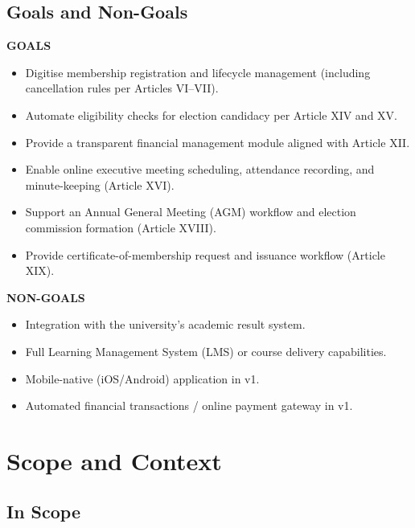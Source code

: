 \documentclass[12pt,a4paper]{article}
\begin{document}
\subsection{Goals and Non-Goals}

\textbf{\small\color{DeepNavy}GOALS}\vspace{4pt}

\begin{itemize}[noitemsep]
  \item Digitise membership registration and lifecycle management (including cancellation rules per Articles VI--VII).
  \item Automate eligibility checks for election candidacy per Article XIV and XV.
  \item Provide a transparent financial management module aligned with Article XII.
  \item Enable online executive meeting scheduling, attendance recording, and minute-keeping (Article XVI).
  \item Support an Annual General Meeting (AGM) workflow and election commission formation (Article XVIII).
  \item Provide certificate-of-membership request and issuance workflow (Article XIX).
\end{itemize}

\textbf{\small\color{DeepNavy}NON-GOALS}\vspace{4pt}

\begin{itemize}[noitemsep]
  \item Integration with the university's academic result system.
  \item Full Learning Management System (LMS) or course delivery capabilities.
  \item Mobile-native (iOS/Android) application in v1.
  \item Automated financial transactions / online payment gateway in v1.
\end{itemize}

\newpage
\section{Scope and Context}

\subsection{In Scope}
\end{document}
